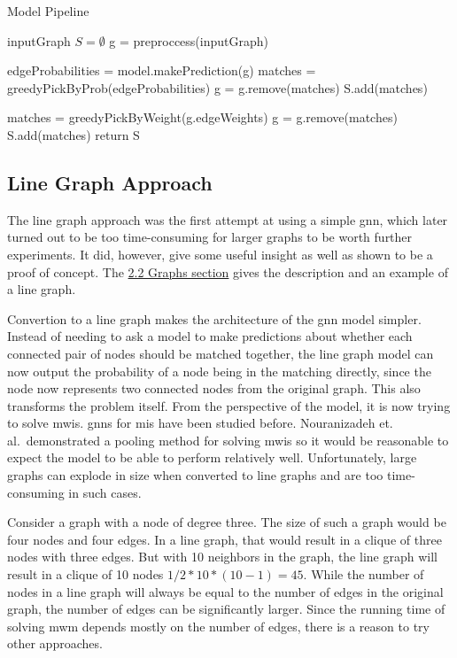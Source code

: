 \begin{algorithm}
\caption{Model Pipeline}\label{alg:cap}

\begin{algorithmic}

\State inputGraph
\State $S = \emptyset$
\State g = preproccess(inputGraph)


\State edgeProbabilities = model.makePrediction(g)
\State matches = greedyPickByProb(edgeProbabilities)
\State g = g.remove(matches)
\State S.add(matches)

  \State matches = greedyPickByWeight(g.edgeWeights)
  \State g = g.remove(matches)
  \State S.add(matches)
\EndIf
\EndWhile
\State return S
\end{algorithmic}
\end{algorithm}

\subsection{Line Graph Approach}

The line graph approach was the first attempt at using a simple \gls{gnn}, which later turned out to be too time-consuming for larger graphs to be worth further experiments. It did, however, give some useful insight as well as shown to be a proof of concept. The \hyperref[sec:preprocessing]{2.2 Graphs section} gives the description and an example of a line graph.

Convertion to a line graph makes the architecture of the \gls{gnn} model simpler. Instead of needing to ask a model to make predictions about whether each connected pair of nodes should be matched together, the line graph model can now output the probability of a node being in the matching directly, since the node now represents two connected nodes from the original graph. This also transforms the problem itself. From the perspective of the model, it is now trying to solve \gls{mwis}. \gls{gnn}s for \gls{mis} have been studied before. Nouranizadeh et. al.\ demonstrated a pooling method for solving \gls{mwis} \cite{DBLPjournals/corr/abs-2107-01410} so it would be reasonable to expect the model to be able to perform relatively well. Unfortunately, large graphs can explode in size when converted to line graphs and are too time-consuming in such cases.

Consider a graph with a node of degree three. The size of such a graph would be four nodes and four edges. In a line graph, that would result in a clique of three nodes with three edges. But with 10 neighbors in the graph, the line graph will result in a clique of 10 nodes $1/2 * 10 * (10-1) = 45$. While the number of nodes in a line graph will always be equal to the number of edges in the original graph, the number of edges can be significantly larger. Since the running time of solving \gls{mwm} depends mostly on the number of edges, there is a reason to try other approaches.

